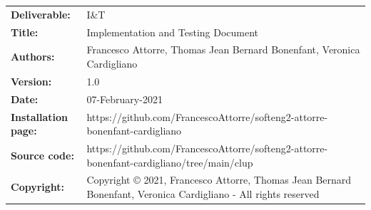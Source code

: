 \begin{table}[h!]
\begin{tabu} to \textwidth { X[0.3,r,p] X[0.7,l,p] }
\hline

\textbf{Deliverable:} & I\&T\\
\textbf{Title:} & Implementation and Testing Document \\
\textbf{Authors:} & Francesco Attorre, Thomas Jean Bernard Bonenfant, Veronica Cardigliano \\
\textbf{Version:} & 1.0 \\ 
\textbf{Date:} & 07-February-2021 \\
\textbf{Installation page:} & https://github.com/FrancescoAttorre/softeng2-attorre-bonenfant-cardigliano \\
\textbf{Source code:} & https://github.com/FrancescoAttorre/softeng2-attorre-bonenfant-cardigliano/tree/main/clup \\
\textbf{Copyright:} & Copyright © 2021, Francesco Attorre, Thomas Jean Bernard Bonenfant, Veronica Cardigliano - All rights reserved \\
\hline
\end{tabu}
\end{table}

\setcounter{page}{2}


\newpage

\hypersetup{linkcolor = black}
\tableofcontents

\newpage

\clearpage
{}
\label{sect:introduction}


